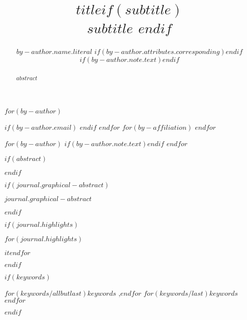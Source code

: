 
\begin{frontmatter}
\title{$title$$if(subtitle)$ \\\large{$subtitle$} $endif$}
$for(by-author)$\author[$for(by-author.affiliations)$$it.number$$sep$,$endfor$]{$by-author.name.literal$%
$if(by-author.attributes.corresponding)$$endif$%
$if(by-author.note.text)$$endif$}
$if(by-author.email)$  $endif$
$endfor$
$for(by-affiliation)$
$endfor$

$for(by-author)$
$if(by-author.note.text)$$endif$
$endfor$
        
$if(abstract)$
\begin{abstract}
$abstract$
\end{abstract}
$endif$

$if(journal.graphical-abstract)$\begin{graphicalabstract}
$journal.graphical-abstract$
\end{graphicalabstract}
$endif$

$if(journal.highlights)$\begin{highlights}
$for(journal.highlights)$\item $it$$endfor$
\end{highlights}
$endif$

$if(keywords)$
\begin{keyword}
    $for(keywords/allbutlast)$$keywords$ \sep $endfor$
    $for(keywords/last)$$keywords$$endfor$
\end{keyword}
$endif$
\end{frontmatter}
    